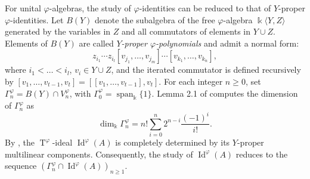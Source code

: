 \documentclass{amsart}
\theoremstyle{definition}
\theoremstyle{remark}
\numberwithin{equation}{section}
\newcommand{\lr}[1]{\langle #1 \rangle}
\def \Ga{\Gamma}
\def \vp{\varphi}
\def \k{\Bbbk}
\def \Id{\operatorname{Id}}
\def \sp{\operatorname{span}}
\def \T{\operatorname{T}}
\begin{document}
	For unital $\vp$-algebras, the study of $\vp$-identities can be reduced to that of $Y$-proper $\vp$-identities. Let $B(Y)$ denote the subalgebra of the free $\vp$-algebra $\k \lr{Y, Z}$ generated by the variables in $Z$ and all commutators of elements in $Y \cup Z$. Elements of $B(Y)$ are called \emph{$Y$-proper $\vp$-polynomials} and admit a normal form: 
	\[
	z_{i_1} \cdots z_{i_l} [v_{j_1},\dots,v_{j_m}] \cdots [v_{k_1},\dots,v_{k_n}],
	\]
	where $i_1 < \dots < i_l$, $v_i \in Y \cup Z$, and the iterated commutator is defined recursively by $[v_1,\dots,v_{t-1},v_t] = [[v_1,\dots,v_{t-1}],v_t]$. For each integer $n \geq 0$, set $\Ga_n^\vp = B(Y) \cap V_n^\vp$, with $\Ga_0^\vp = \sp_\k \{1\}$. Lemma 2.1 of \cite{MMM} computes the dimension of $\Ga_n^\vp$ as
	\[
	\dim_{\k} \Ga_n^\vp = n! \sum_{i=0}^{n} 2^{n-i} \frac{(-1)^i}{i!}.
	\]
	By \cite[Theorem 4.3.3]{Dr}, the $\T^\vp$-ideal $\Id^\vp(A)$ is completely determined by its $Y$-proper multilinear components. Consequently, the study of $\Id^\vp(A)$ reduces to the sequence $(\Ga_n^\vp \cap \Id^\vp(A))_{n \geq 1}$.
	
\end{document}
